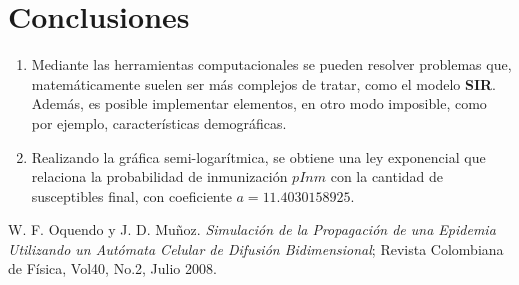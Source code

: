 \documentclass[twoside,twocolumn]{article}
\begin{document}
\section{Conclusiones}
\begin{enumerate}
\item Mediante las herramientas computacionales se pueden resolver problemas que, matemáticamente suelen ser más complejos de tratar, como el modelo \textbf{SIR}. Además, es posible implementar elementos, en otro modo imposible, como por ejemplo, características demográficas.

\item Realizando la gráfica semi-logarítmica, se obtiene una ley exponencial que relaciona la probabilidad de inmunización $pInm$ con la cantidad de susceptibles final, con coeficiente $a=11.4030158925$. 
\end{enumerate}
\begin{thebibliography}{99} %

W. F. Oquendo y J. D. Muñoz.  \emph{Simulación de la Propagación de una Epidemia Utilizando un Autómata Celular de Difusión Bidimensional}; Revista Colombiana de Física, Vol40, No.2, Julio 2008.

\end{thebibliography}
\end{document}
